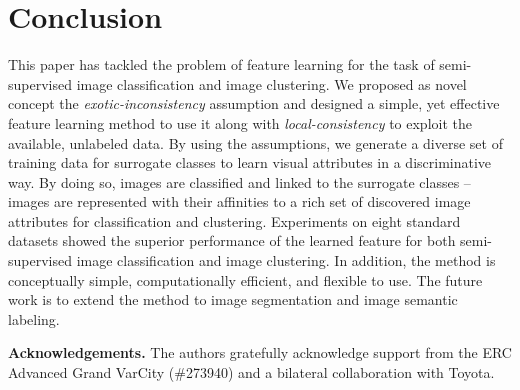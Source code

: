 \section{Conclusion} 
\label{sec:conclusion}
This paper has tackled the problem of feature learning for the task of
semi-supervised image classification and image clustering.  We
proposed as novel concept the \emph{exotic-inconsi\-stency} assumption
and designed a simple, yet effective feature learning method to use it
along with \emph{local-consistency} to exploit the available,
unlabeled data. By using the assumptions, we generate a diverse set of
training data for surrogate classes to learn visual attributes in a
discriminative way.  By doing so, images are classified and linked to
the surrogate classes -- images are represented with their affinities
to a rich set of discovered image attributes for classification and
clustering. Experiments on eight standard datasets showed the superior
performance of the learned feature for both semi-supervised image
classification and image clustering. In addition, the method is
conceptually simple, computationally efficient, and flexible to use.
The future work is to extend the method to image segmentation and
image semantic labeling.




\vspace{2mm}
\noindent
\textbf{Acknowledgements.} The authors gratefully acknowledge support
from the ERC Advanced Grand VarCity (\#273940) and a bilateral collaboration with
Toyota.








